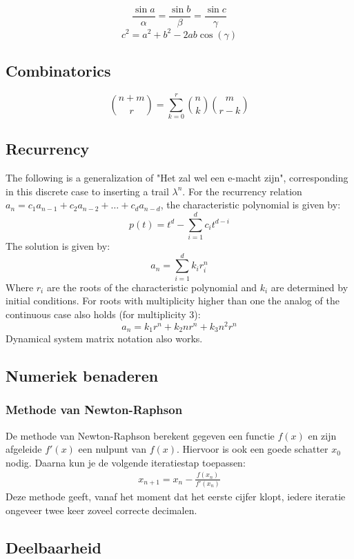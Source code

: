 \documentclass[10pt,hidelinks]{article}
\begin{document}
\[\frac{\sin a}{\alpha} = \frac{\sin b}{\beta} =\frac{\sin c}{\gamma}\]
\[c^2=a^2+b^2-2ab\cos(\gamma)\]

\subsection{Combinatorics}

\[\binom{n+m}{r} = \sum_{k=0}^r \binom{n}{k} \binom{m}{r-k}\]

\subsection{Recurrency}
The following is a generalization of "Het zal wel een e-macht zijn", corresponding in this discrete case to inserting a trail $\lambda^n$.
For the recurrency relation $a_n = c_1a_{n-1} + c_2a_{n-2} + \dots + c_da_{n-d}$, the characteristic polynomial is given by:
\[p(t) = t^d - \sum_{i=1}^d c_it^{d-i}\]
The solution is given by:
\[a_n = \sum_{i=1}^d k_ir_i^n\]
Where $r_i$ are the roots of the characteristic polynomial and $k_i$ are determined by initial conditions. For roots with multiplicity higher than one the analog of the continuous case also holds (for multiplicity 3):
\[a_n = k_1r^n+k_2nr^n+k_3n^2r^n\]
Dynamical system matrix notation also works.

\subsection{Numeriek benaderen}

\subsubsection{Methode van Newton-Raphson}

De methode van Newton-Raphson berekent gegeven een functie $f(x)$ en zijn afgeleide $f'(x)$ een nulpunt van $f(x)$. Hiervoor is ook een goede schatter $x_0$ nodig. Daarna kun je de volgende iteratiestap toepassen:
\begin{align*}
    x_{n+1} = x_{n} - \frac{f(x_{n})}{f'(x_{n})}
\end{align*}
Deze methode geeft, vanaf het moment dat het eerste cijfer klopt, iedere iteratie ongeveer twee keer zoveel correcte decimalen.


\subsection{Deelbaarheid}
\end{document}
